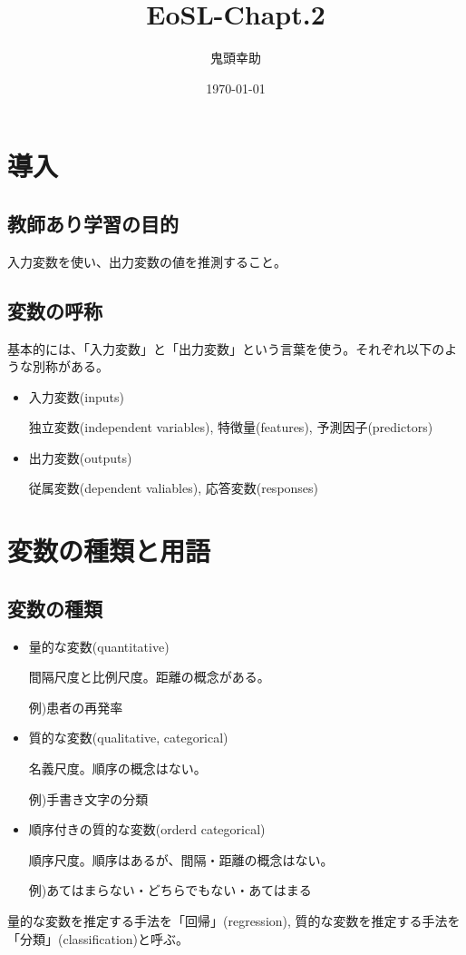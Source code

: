 \documentclass[uplatex]{jsarticle}
\title{EoSL-Chapt.2}
\author{鬼頭幸助}
\date{\today}
\begin{document}
\maketitle
\section{導入}
\subsection{教師あり学習の目的}

入力変数を使い、出力変数の値を推測すること。

\subsection{変数の呼称}
基本的には、「入力変数」と「出力変数」という言葉を使う。それぞれ以下のような別称がある。
\begin{itemize}
    \item 入力変数(inputs)

    独立変数(independent variables), 特徴量(features), 予測因子(predictors)

    \item 出力変数(outputs)

    従属変数(dependent valiables), 応答変数(responses)
\end{itemize}

\section{変数の種類と用語}
\subsection{変数の種類}
\begin{itemize}
  \item 量的な変数(quantitative)

  間隔尺度と比例尺度。距離の概念がある。

  例)患者の再発率

  \item 質的な変数(qualitative, categorical)

  名義尺度。順序の概念はない。

  例)手書き文字の分類

  \item 順序付きの質的な変数(orderd categorical)

  順序尺度。順序はあるが、間隔・距離の概念はない。

  例)あてはまらない・どちらでもない・あてはまる

\end{itemize}
量的な変数を推定する手法を「回帰」(regression),
質的な変数を推定する手法を「分類」(classification)と呼ぶ。
\end{document}
